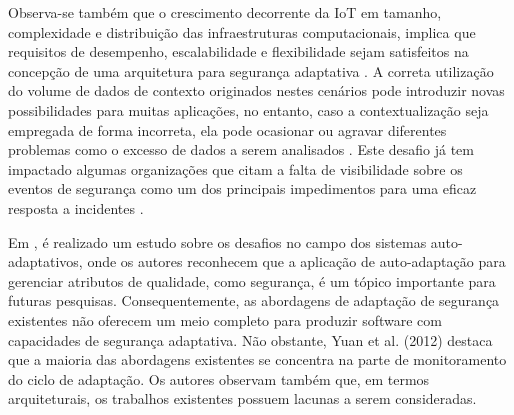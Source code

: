 \documentclass[tid,table]{texufpel} %
\begin{document}
Observa-se também que o crescimento decorrente da IoT em tamanho, complexidade e distribuição das infraestruturas computacionais, implica que requisitos de desempenho, escalabilidade e flexibilidade sejam satisfeitos na concepção de uma arquitetura para segurança adaptativa \cite{onwubiko12, liu08, ghorbani10, hu14}.  A correta utilização do volume de dados de contexto originados nestes cenários pode introduzir novas possibilidades para muitas aplicações, no entanto, caso a contextualização seja empregada de forma incorreta, ela pode ocasionar ou agravar diferentes problemas como o excesso de dados a serem analisados \cite{li15}. Este desafio já tem impactado algumas organizações que citam a falta de visibilidade sobre os eventos de segurança como um dos principais impedimentos para uma eficaz resposta a incidentes \cite{sansir15}.

Em \cite{weyns12}, é realizado um estudo sobre os desafios no campo dos sistemas auto-adaptativos, onde os autores reconhecem que a aplicação de auto-adaptação para gerenciar atributos de qualidade, como segurança, é um tópico importante para futuras pesquisas. Consequentemente, as abordagens de adaptação de segurança existentes não oferecem um meio completo para produzir software com capacidades de segurança adaptativa. %
Não obstante, Yuan et al. (2012)\nocite{yuan12} destaca que a maioria das abordagens existentes se concentra na parte de monitoramento do ciclo de adaptação. Os autores observam também que, em termos arquiteturais, os trabalhos existentes possuem lacunas a serem consideradas. 
\end{document}
